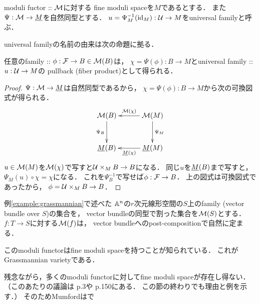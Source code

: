 \documentclass[a4paper]{jsarticle}
\begin{document}
    \begin{Def}
        moduli fuctor :: $\ftorM$に対する
        fine moduli spaceを$M$であるとする．
        また$\Psi: \ftorM \to \ftor{M}$を自然同型とする．
        $u=\Psi_M^{-1}(\id[M]): \famU \to M$をuniversal familyと呼ぶ．
    \end{Def}

    universal familyの名前の由来は次の命題に拠る．
    \begin{Prop}\label{prop:univfamily}
        任意のfamily :: $\phi: \famF \to B \in \ftorM(B)$は，
        $\chi=\Psi(\phi): B \to M$とuniversal family :: $u: \famU \to M$の
        pullback (fiber product)として得られる．
    \end{Prop}
    \begin{proof}
        $\Psi: \ftorM \to \ftor{M}$は自然同型であるから，
        $\chi=\Psi(\phi): B \to M$から次の可換図式が得られる．
        \[\xymatrix@=30pt{
                \ftorM(B) \ar[d]_-{\Psi_B}& \ftorM(M) \ar[l]_-{\ftorM(\chi)}\ar[d]^-{\Psi_M}\\
                \ftor{M}(B) & \ar[l]^-{\ftor{M}(\chi)} \ftor{M}(M) \\
        }\]
        $u \in \ftorM(M)$を$\ftorM(\chi)$で写すと$\famU \times_M B \to B$になる．
        同じ$u$を$\ftor{M}(B)$まで写すと，$\Psi_M(u) \circ \chi=\chi$になる．
        これを$\Psi_B^{-1}$で写せば$\phi:\famF \to B$．
        上の図式は可換図式であったから，
        $\phi=\famU \times_M B \to B$．
    \end{proof}

    \begin{Example}
        例\ref{example:grassmannian}で述べた
        $\affine^n$の$r$次元線形空間の$S$上のfamily
        (vector bundle over $S$)の集合を，
        vector bundleの同型で割った集合を$\ftorM(S)$とする．
        $f: T \to S$に対する$\ftorM(f)$は，
        vector bundleへのpost-compositionで自然に定まる．

        このmoduli functorはfine moduli spaceを持つことが知られている．
        これがGrassmannian varietyである．
    \end{Example}

    残念ながら，多くのmoduli functorに対してfine moduli spaceが存在し得ない．
    （このあたりの議論は\cite{HaMo} p.3や\cite{HarDef} p.150にある．
    この節の終わりでも理由と例を示す．）
    そのためMumfordは\cite{GIT}で
\end{document}
